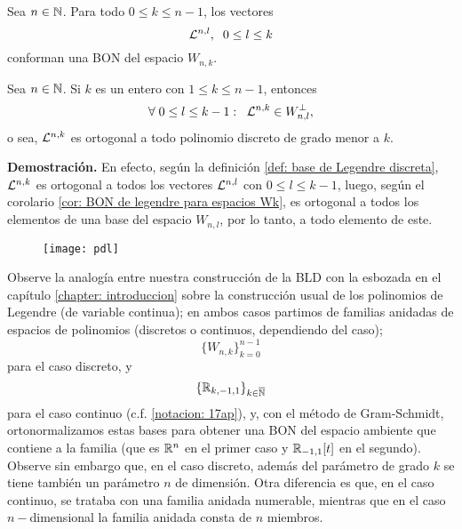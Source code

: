 \begin{cor} \label{cor: BON de legendre para espacios Wk}
Sea $n \in \mathbb{N}$. Para todo $0 \leq k \leq n-1$, los vectores
\[
\mathcal{L}^{n, l}, \hspace{0.2cm} 0 \leq l \leq k
\]
conforman una BON del espacio $W_{n,k}$.
\end{cor}

\begin{cor} \label{cor: Ln,k ortogonal a todo pol discreto de grado menor a k}
Sea $n \in \mathbb{N}$. Si $k$ es un entero con $1 \leq k \leq n-1$,
entonces
\[
\forall \hspace{0.1cm} 0 \leq l \leq k-1:
\hspace{0.2cm}
\mathcal{L}^{n,k} \in W_{n,l}^{\perp},
\]
o sea, 
$\mathcal{L}^{n,k}$ es ortogonal a todo polinomio discreto
de grado menor a $k$.
\end{cor}
\noindent
\textbf{Demostración.}
En efecto, según la definición
\ref{def: base de Legendre discreta}, 
$\mathcal{L}^{n,k}$ es ortogonal a todos los vectores
$\mathcal{L}^{n, l}$ con $0 \leq l \leq k-1$,
luego, según el corolario
\ref{cor: BON de legendre para espacios Wk},
es
ortogonal a todos los elementos
de una base del espacio $W_{n,l}$,
por lo tanto, a todo elemento de este.
\QEDB
\vspace{0.2cm}



\begin{figure}[H]
	\centering
	\texttt{[image: pdl]} 
\end{figure}	


\begin{nota}
Observe la analogía entre nuestra construcción de la BLD
con la esbozada en el capítulo 
\ref{chapter: introduccion} sobre la construcción 
usual de los polinomios
de Legendre (de variable continua);
en ambos casos partimos de familias anidadas de espacios 
de polinomios
(discretos o continuos, dependiendo del caso);
	\[
	\{ W_{n,k} \}_{k=0}^{n-1} 
	\]
para el caso discreto, y
	\[
	\{ \mathbb{R}_{k,-1,1} \}_{k \in \overline{\mathbb{N}}}
	\]	
para el caso continuo (c.f. \ref{notacion: 17ap}),
y, con el 
método de Gram-Schmidt, ortonormalizamos estas bases para obtener
una BON del espacio ambiente que contiene a la familia
(que es $\mathbb{R}^{n}$ en el primer caso y $\mathbb{R}_{-1,1}[t]$
en el segundo). \\

Observe sin embargo que, en el caso discreto, además
del parámetro de grado $k$ se tiene también un parámetro
$n$ de dimensión. Otra diferencia es que, en el caso 
continuo, se trataba con una familia anidada numerable, mientras
que en el caso $n-$dimensional la familia anidada consta
de $n$ miembros.
\end{nota}


